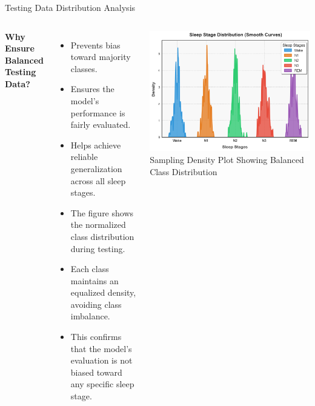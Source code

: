 \begin{frame}{Testing Data Distribution Analysis}

    \begin{columns}

        \textbf{Why Ensure Balanced Testing Data?}
        \begin{itemize}
     \item Prevents bias toward majority classes.
        \item Ensures the model's performance is fairly evaluated.
        \item Helps achieve reliable generalization across all sleep stages.
           \item The figure shows the normalized class distribution during testing.
        \item Each class maintains an equalized density, avoiding class imbalance.
        \item This confirms that the model's evaluation is not biased toward any specific sleep stage.
        \end{itemize}

        \centering
        \includegraphics[width=0.9\linewidth]{images/paper_3/sample distribution plot pdf.png} %
        \vspace{5pt}
        {\textcolor{uwopurple}{\small Sampling Density Plot Showing Balanced Class Distribution}}

    \end{columns}

\end{frame}


